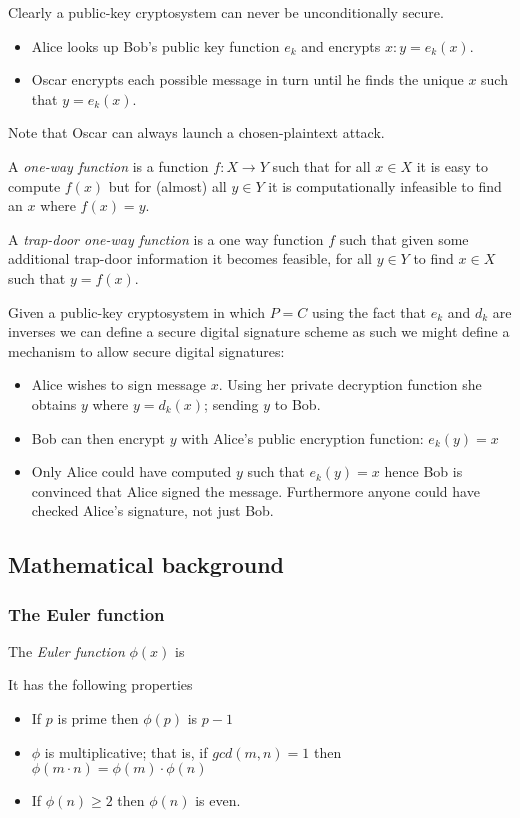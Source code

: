 Clearly a public-key cryptosystem can never be unconditionally secure.
\begin{itemize}
    \item Alice looks up Bob’s public key function $e_k$ and encrypts $x : y = e_k(x)$.
    \item Oscar encrypts each possible message in turn until he finds the unique $x$ such that $y = e_k(x)$.
\end{itemize}
Note that Oscar can always launch a chosen-plaintext attack.

\begin{definition}
    A \textit{one-way function} is a function $f : X \rightarrow Y$ such that 
    for all $x \in X$ it is easy to compute $f(x)$ but for (almost) all $y \in Y$ it is computationally
    infeasible to find an $x$ where $f(x) = y$.
\end{definition}
\begin{definition}
    A \textit{trap-door one-way function} is a one way function $f$ such that
    given some additional trap-door information it becomes feasible, 
    for all $y \in Y$ to find $x \in X$ such that $y = f(x)$.
\end{definition}

Given a public-key cryptosystem in which $P = C$
using the fact that $e_k$ and $d_k$ are inverses
we can define a secure digital signature scheme as such
we might define a mechanism to allow secure digital signatures:
\begin{itemize}
    \item
        Alice wishes to sign message $x$.
        Using her private decryption function she obtains $y$ where $y = d_k(x)$;
        sending $y$ to Bob.
    \item Bob can then encrypt $y$ with Alice’s public encryption function: $e_k(y) = x$
    \item Only Alice could have computed $y$ such that $e_k(y) = x$ hence Bob is convinced that
    Alice signed the message.
    Furthermore anyone could have checked Alice’s signature, not just Bob.
\end{itemize}

\subsection{Mathematical background}
\subsubsection{The Euler function}
\begin{definition}
    The \textit{Euler function} $\phi(x)$ is
\end{definition}
It has the following properties
\begin{itemize}
    \item If $p$ is prime then $\phi(p)$ is $p - 1$
    \item $\phi$ is multiplicative; that is,
        if $gcd(m,n) = 1$ then $\phi(m \cdot n) = \phi(m) \cdot \phi(n)$
    \item If $\phi(n) \geq 2$ then $\phi(n)$ is even.
\end{itemize}

